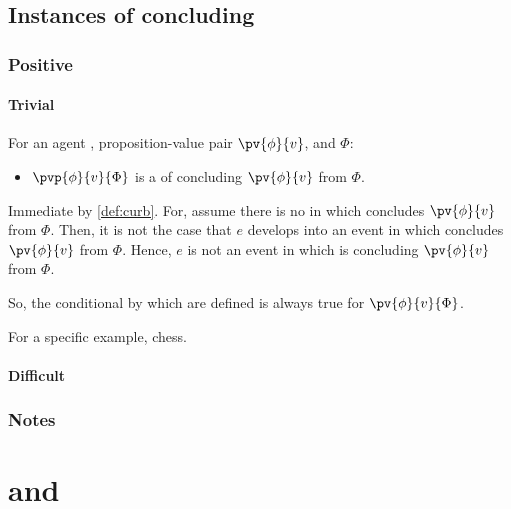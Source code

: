 \subsection{Instances of concluding}
\label{sec:instances-concluding}

\subsubsection{Positive}
\label{sec:positive}

\paragraph{Trivial}

\begin{note}
  \begin{proposition}
    For an agent \vAgent{}, proposition-value pair \(\pv{\phi}{v}\), and \poP{} \(\Phi\):

    \begin{itemize}
    \item
      \(\pvp{\phi}{v}{\Phi}\) is a \curb{} of \vAgent{} concluding \(\pv{\phi}{v}\) from \(\Phi\).
    \end{itemize}
    \begin{argument}
      Immediate by \autoref{def:curb}.
      For, assume there is no \pevent{} in which \vAgent{} concludes \(\pv{\phi}{v}\) from \(\Phi\).
      Then, it is not the case that \(e\) develops into an event in which \vAgent{} concludes \(\pv{\phi}{v}\) from \(\Phi\).
      Hence, \(e\) is not an event in which \vAgent{} is concluding \(\pv{\phi}{v}\) from \(\Phi\).

      So, the conditional by which  are defined is always true for \(\pv{\phi}{v}{\Phi}\).
    \end{argument}
  \end{proposition}

  For a specific example, chess.
\end{note}

\paragraph{Difficult}

\subsubsection{Notes}
\label{sec:notes}


\section{ and }

